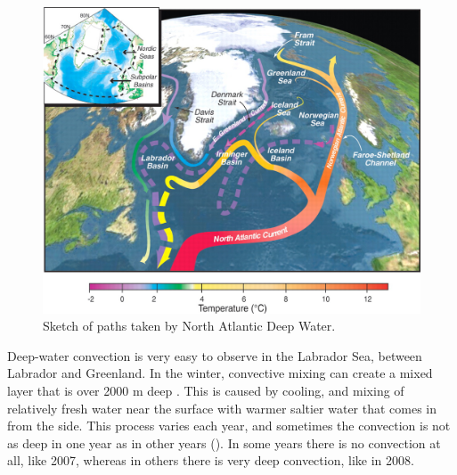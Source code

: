 \begin{figure}[hbt]
  \begin{center}
    \includegraphics{figs/WaterMasses/NADWSketch}
    \caption{Sketch of paths taken by North Atlantic Deep Water. \citep{currymauritzen2005} }
    \label{fig:NADWSketch}  
  \end{center}
\end{figure}

Deep-water convection is very easy to observe in the Labrador Sea, between Labrador and Greenland.  In the winter, convective mixing can create a mixed layer that is over 2000 m deep .  This is caused by cooling, and mixing of relatively fresh water near the surface with warmer saltier water that comes in from the side.  This process varies each year, and sometimes the convection is not as deep in one year as in other years ().  In some years there is no convection at all, like 2007, whereas in others there is very deep convection, like in 2008.   

